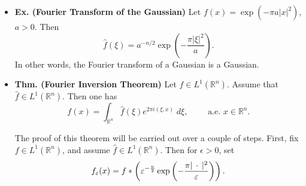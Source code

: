 \documentclass{article}
\begin{document}
\begin{itemize}
	\item \textbf{Ex. (Fourier Transform of the Gaussian)} Let $f(x) =\exp(-\pi a|x|^{2})$, $a > 0$. Then 
		\begin{equation}
			\hat{f}(\xi) = a^{-n/2}\exp\left(-\frac{\pi |\xi|^{2}}{a}\right).
		\end{equation}
	In other words, the Fourier transform of a Gaussian is a Gaussian. 
	
	\item \textbf{Thm. (Fourier Inversion Theorem)} Let $f \in L^{1}(\mathbb{R}^{n})$. Assume that $\hat{f} \in L^{1}(\mathbb{R}^{n})$. Then one has
		\begin{equation}
			f(x) = \int_{\mathbb{R}^{n}}\hat{f}(\xi)e^{2\pi i (\xi, x)}\;d\xi, \qquad \text{ a.e. $x \in \mathbb{R}^{n}$}. 
		\end{equation}
		
	{\color{blue} 
		The proof of this theorem will be carried out over a couple of steps. First, fix $f \in L^{1}(\mathbb{R}^{n})$, and assume $\hat{f} \in L^{1}(\mathbb{R}^{n})$. Then for $\epsilon > 0$, set 
			\begin{equation}
				f_{\varepsilon}(x) = f \ast \left(\varepsilon^{-\frac{n}{2}}\exp\left(-\frac{\pi |\hspace{2pt}\cdot\hspace{2pt}|^{2}}{\varepsilon}\right)\right). 
			\end{equation}	
		
}
\end{itemize}
\end{document}
